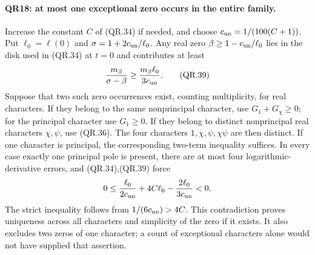 \paragraph{QR18: at most one exceptional zero occurs in the entire family.}
Increase the constant $C$ of (QR.34) if needed, and choose
$c_{\rm un}=1/(100(C+1))$. Put $\ell_0=\ell(0)$ and
$\sigma=1+2c_{\rm un}/\ell_0$.
Any real zero $\beta\ge1-c_{\rm un}/\ell_0$ lies in the
disk used in (QR.34) at $t=0$ and contributes at least
\[
             \frac{m_\beta}{\sigma-\beta}
                    \ge\frac{m_\beta\ell_0}{3c_{\rm un}}.\tag{QR.39}
\]
Suppose that two such zero occurrences exist, counting multiplicity,
for real characters. If they belong to the same nonprincipal
character, use $G_1+G_\chi\ge0$; for the principal character
use $G_1\ge0$. If they belong to distinct nonprincipal real
characters $\chi,\psi$, use (QR.36). The four characters
$1,\chi,\psi,\chi\psi$ are then distinct. If one character
is principal, the corresponding two-term inequality suffices.
In every case exactly one principal pole is present, there are at
most four logarithmic-derivative errors, and (QR.34),(QR.39) force
\[
       0\le\frac{\ell_0}{2c_{\rm un}}+4C\ell_0
                                 -\frac{2\ell_0}{3c_{\rm un}}<0.
\]
The strict inequality follows from $1/(6c_{\rm un})>4C$.
This contradiction proves uniqueness across all characters and
simplicity of the zero if it exists. It also excludes two zeros
of one character; a count of exceptional characters alone would
not have supplied that assertion.

